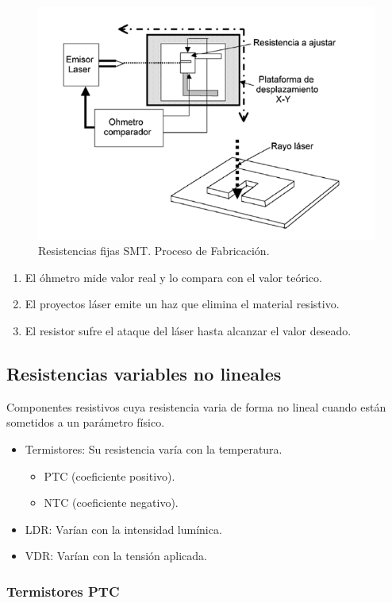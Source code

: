 \begin{figure}[H]
    \centering
    \includegraphics[width=0.5\linewidth]{Imagenes/Resistencias SMT - Proceso de Fabricacion.png}
    \caption{Resistencias fijas SMT. Proceso de Fabricación.}
\end{figure}

\begin{enumerate}
    \item El óhmetro mide valor real y lo compara con el valor teórico.
    \item El proyectos láser emite un haz que elimina el material resistivo.
    \item El resistor sufre el ataque del láser hasta alcanzar el valor deseado.
\end{enumerate}

\subsection{Resistencias variables no lineales}

Componentes resistivos cuya resistencia varia de forma no lineal cuando están sometidos a un parámetro físico.

\begin{itemize}
    \item Termistores: Su resistencia varía con la temperatura. 
    \begin{itemize}
        \item PTC (coeficiente positivo).
        \item NTC (coeficiente negativo).
    \end{itemize}
    \item LDR: Varían con la intensidad lumínica.
    \item VDR: Varían con la tensión aplicada.
\end{itemize}

\subsubsection{Termistores PTC}

